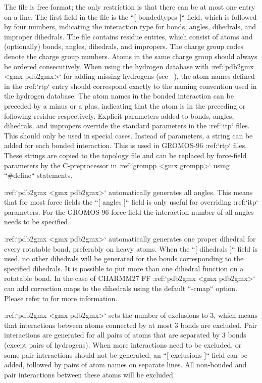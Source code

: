The file is free format; the only restriction is that there can be at
most one entry on a line. The first field in the file is the
``[ bondedtypes ]`` field, which is followed by four
numbers, indicating the interaction type for bonds, angles, dihedrals,
and improper dihedrals. The file contains residue entries, which consist
of atoms and (optionally) bonds, angles, dihedrals, and impropers. The
charge group codes denote the charge group numbers. Atoms in the same
charge group should always be ordered consecutively. When using the
hydrogen database with :ref:`pdb2gmx <gmx pdb2gmx>` for adding missing
hydrogens (see 
), the atom names defined in
the :ref:`rtp` entry should correspond exactly to the naming
convention used in the hydrogen database. The atom names in the bonded
interaction can be preceded by a minus or a plus, indicating that the
atom is in the preceding or following residue respectively. Explicit
parameters added to bonds, angles, dihedrals, and impropers override the
standard parameters in the :ref:`itp` files. This should only
be used in special cases. Instead of parameters, a string can be added
for each bonded interaction. This is used in GROMOS-96
:ref:`rtp` files. These strings are copied to the topology
file and can be replaced by force-field parameters by the C-preprocessor
in :ref:`grompp <gmx grompp>` using ``#define`` statements.

:ref:`pdb2gmx <gmx pdb2gmx>` automatically generates all angles. This means
that for most force fields the ``[ angles ]`` field is only
useful for overriding :ref:`itp` parameters. For the GROMOS-96
force field the interaction number of all angles needs to be specified.

:ref:`pdb2gmx <gmx pdb2gmx>` automatically generates one proper dihedral for
every rotatable bond, preferably on heavy atoms. When the
``[ dihedrals ]`` field is used, no other dihedrals will be
generated for the bonds corresponding to the specified dihedrals. It is
possible to put more than one dihedral function on a rotatable bond. In
the case of CHARMM27 FF :ref:`pdb2gmx <gmx pdb2gmx>` can add correction maps
to the dihedrals using the default ``-cmap`` option. Please
refer to 
for more information.

:ref:`pdb2gmx <gmx pdb2gmx>` sets the number of exclusions to 3, which means
that interactions between atoms connected by at most 3 bonds are
excluded. Pair interactions are generated for all pairs of atoms that
are separated by 3 bonds (except pairs of hydrogens). When more
interactions need to be excluded, or some pair interactions should not
be generated, an ``[ exclusions ]`` field can be added,
followed by pairs of atom names on separate lines. All non-bonded and
pair interactions between these atoms will be excluded.

